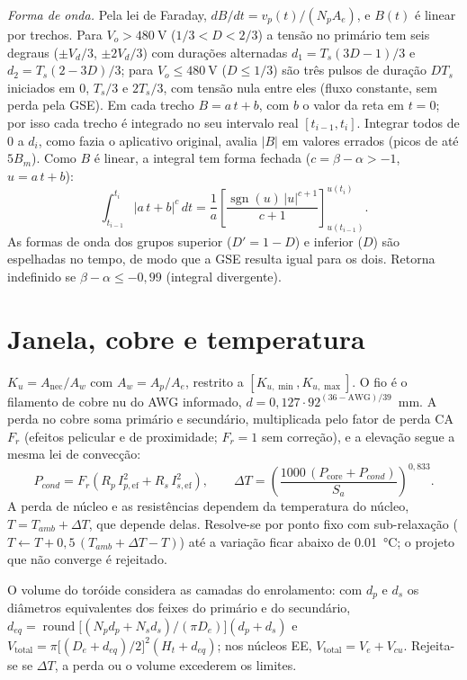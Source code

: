 \documentclass[
	a4paper, 12pt,
	chapter=TITLE, section=Title, subsection=Title,
	oneside, english, brazil, fleqn
]{abntex2}
\begin{document}
\textit{Forma de onda.} Pela lei de Faraday, $dB/dt=v_p(t)/(N_pA_e)$, e $B(t)$ é
linear por trechos. Para $V_o>\SI{480}{\volt}$ ($1/3<D<2/3$) a tensão no primário
tem seis degraus ($\pm V_d/3$, $\pm2V_d/3$) com durações alternadas
$d_1=T_s(3D-1)/3$ e $d_2=T_s(2-3D)/3$; para $V_o\le\SI{480}{\volt}$ ($D\le1/3$)
são três pulsos de duração $DT_s$ iniciados em $0$, $T_s/3$ e $2T_s/3$, com tensão
nula entre eles (fluxo constante, sem perda pela GSE). Em cada trecho
$B=a\,t+b$, com $b$ o valor da reta em $t=0$; por isso cada trecho é integrado no
seu intervalo real $[t_{i-1},t_i]$. Integrar todos de $0$ a $d_i$, como fazia o
aplicativo original, avalia $|B|$ em valores errados (picos de até $5B_m$). Como
$B$ é linear, a integral tem forma fechada ($c=\beta-\alpha>-1$, $u=a\,t+b$):
\begin{equation}
	\int_{t_{i-1}}^{t_i}\!|a\,t+b|^{c}\,dt=\frac{1}{a}\left[\frac{\operatorname{sgn}(u)\,|u|^{c+1}}{c+1}\right]_{u(t_{i-1})}^{u(t_i)}.
	\label{eq:gsefechada}
\end{equation}
As formas de onda dos grupos superior ($D'=1-D$) e inferior ($D$) são espelhadas
no tempo, de modo que a GSE resulta igual para os dois. Retorna indefinido se
$\beta-\alpha\le-0{,}99$ (integral divergente).

\section{Janela, cobre e temperatura}
$K_u=A_{\mathrm{nec}}/A_w$ com $A_w=A_p/A_e$, restrito a
$[K_{u,\min},K_{u,\max}]$. O fio é o filamento de cobre nu do AWG informado,
$d=0{,}127\cdot92^{(36-\mathrm{AWG})/39}$~mm. A perda no cobre soma primário e
secundário, multiplicada pelo fator de perda CA $F_r$ (efeitos pelicular e de
proximidade; $F_r=1$ sem correção), e a elevação segue a mesma lei de convecção:
\begin{equation}
	P_{cond}=F_r\left(R_p\,I_{p,\mathrm{ef}}^{2}+R_s\,I_{s,\mathrm{ef}}^{2}\right),\qquad
	\Delta T=\!\left(\frac{1000\,(P_{\mathrm{core}}+P_{cond})}{S_a}\right)^{\!0{,}833}.
	\label{eq:dttraf}
\end{equation}
A perda de núcleo e as resistências dependem da temperatura do núcleo,
$T=T_{amb}+\Delta T$, que depende delas. Resolve-se por ponto fixo com
sub-relaxação ($T\leftarrow T+0{,}5\,(T_{amb}+\Delta T-T)$) até a variação ficar
abaixo de \SI{0.01}{\degreeCelsius}; o projeto que não converge é rejeitado.

O volume do toróide considera as camadas do enrolamento: com $d_p$ e $d_s$ os
diâmetros equivalentes dos feixes do primário e do secundário,
$d_{eq}=\operatorname{round}\!\bigl[(N_pd_p+N_sd_s)/(\pi D_e)\bigr](d_p+d_s)$ e
$V_{\mathrm{total}}=\pi\bigl[(D_e+d_{eq})/2\bigr]^2(H_t+d_{eq})$; nos núcleos EE,
$V_{\mathrm{total}}=V_e+V_{cu}$. Rejeita-se se $\Delta T$, a perda ou o volume
excederem os limites.
\end{document}
